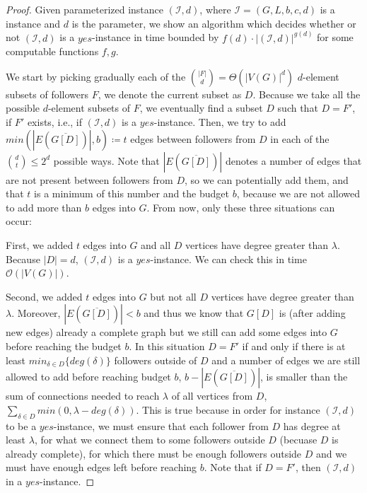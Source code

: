 \begin{proof}
    Given parameterized instance $(\mathcal{I}, d)$, where $\mathcal{I} = (G, L, b, c, d)$ is a \HLdeg instance and $d$ is the parameter,
    we show an algorithm which decides whether or not $(\mathcal{I}, d)$ is a $yes$-instance in time bounded by
    $f(d) \cdot |(\mathcal{I}, d)|^{g(d)}$ for some computable functions $f,g$.

    We start by picking gradually each of the $\binom{|F|}{d} = \Theta(|V(G)|^d)$ $d$-element subsets of followers $F$,
    we denote the current subset as $D$.
    Because we take all the possible $d$-element subsets of $F$, we eventually find a subset $D$ such that $D = F'$,
    if $F'$ exists, i.e., if $(\mathcal{I}, d)$ is a $yes$-instance.
    Then, we try to add $min(|E(\overline{G[D]})|, b) \coloneqq t$ edges between followers from $D$ in each of the $\binom{d}{t} \leq 2^d$ possible ways.
    Note that $|E(\overline{G[D]})|$ denotes a number of edges that are not present between followers from $D$,
    so we can potentially add them, and that $t$ is a minimum of this number and the budget $b$,
    because we are not allowed to add more than $b$ edges into $G$.
    From now, only these three situations can occur:

    First, we added $t$ edges into $G$ and all $D$ vertices have degree greater than $\lambda$.
    Because $|D| = d$, $(\mathcal{I}, d)$ is a $yes$-instance.
    We can check this in time $\mathcal{O}(|V(G)|)$.
    
    Second, we added $t$ edges into $G$ but not all $D$ vertices have degree greater than $\lambda$.
    Moreover, $|E(\overline{G[D]})| < b$ and thus we know that $G[D]$ is (after adding new edges) already a complete graph
    but we still can add some edges into $G$ before reaching the budget $b$. 
    In this situation $D = F'$ if and only if there is at least $min_{\delta \in D}\{deg(\delta)\}$ followers
    outside of $D$ and a number of edges we are still allowed to add before reaching budget $b$, $b - |E(\overline{G[D]})|$,
    is smaller than the sum of connections needed to reach $\lambda$ of all vertices from $D$,
    $\sum_{\delta \in D} min(0, \lambda - deg(\delta))$.
    This is true because in order for instance $(\mathcal{I}, d)$ to be a $yes$-instance, we must
    ensure that each follower from $D$ has degree at least $\lambda$, for what we connect them to some followers
    outside $D$ (becuase $D$ is already complete), for which there must be enough followers outside $D$ and
    we must have enough edges left before reaching $b$.
    Note that if $D = F'$, then $(\mathcal{I}, d)$ in a $yes$-instance.
    

\end{proof}
